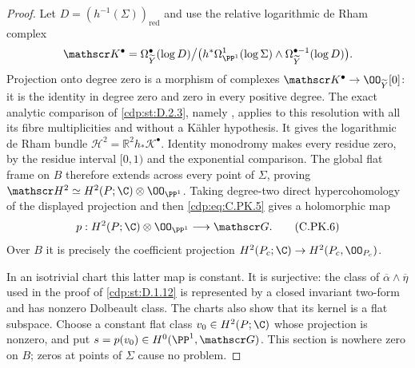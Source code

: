 \begin{proof}
Let $D=(h^{-1}(\Sigma))_{\mathrm{red}}$ and use the
relative logarithmic de Rham complex
\[
 \mathscr K^\bullet=
 \Omega_{\widetilde Y}^\bullet(\log D)\big/
 \bigl(h^*\Omega_{\PP^1}^1(\log\Sigma)
       \wedge\Omega_{\widetilde Y}^{\bullet-1}(\log D)\bigr).
\]
Projection onto degree zero is a morphism of complexes
$\mathscr K^\bullet\to\OO_{\widetilde Y}[0]$:
it is the identity in degree zero and zero in every
positive degree. The exact analytic comparison of \ref{cdp:st:D.2.3},
namely \cite[Theorem~2.18 and \S\S2.19--2.21]{Steenbrink1976},
applies to this resolution with all its fibre multiplicities
and without a K\"ahler hypothesis. It gives the logarithmic
de Rham bundle
$\mathscr H^2=\mathbb R^2h_*\mathscr K^\bullet$.
Identity monodromy makes every residue zero, by the
residue interval $[0,1)$ and the exponential comparison.
The global flat frame on $B$ therefore extends across
every point of $\Sigma$, proving
$\mathscr H^2\simeq H^2(P;\C)\otimes\OO_{\PP^1}$.
Taking degree-two direct hypercohomology of the displayed
projection and then \eqref{cdp:eq:C.PK.5} gives a holomorphic map
\[
 p:H^2(P;\C)\otimes\OO_{\PP^1}
          \longrightarrow\mathscr G.
\tag{C.PK.6}\label{cdp:eq:C.PK.6}
\]
Over $B$ it is precisely the coefficient projection
$H^2(P_c;\C)\to H^2(P_c,\OO_{P_c})$.

In an isotrivial chart this latter map is constant. It is
surjective: the class of
$\overline\alpha\wedge\overline\eta$ used in the proof
of \ref{cdp:st:D.1.12} is represented by a closed invariant two-form
and has nonzero Dolbeault class. The charts also show
that its kernel is a flat subspace. Choose a constant flat
class $v_0\in H^2(P;\C)$ whose projection is nonzero,
and put $s=p(v_0)\in H^0(\PP^1,\mathscr G)$.
This section is nowhere zero on $B$; zeros at points
of $\Sigma$ cause no problem.


\end{proof}
